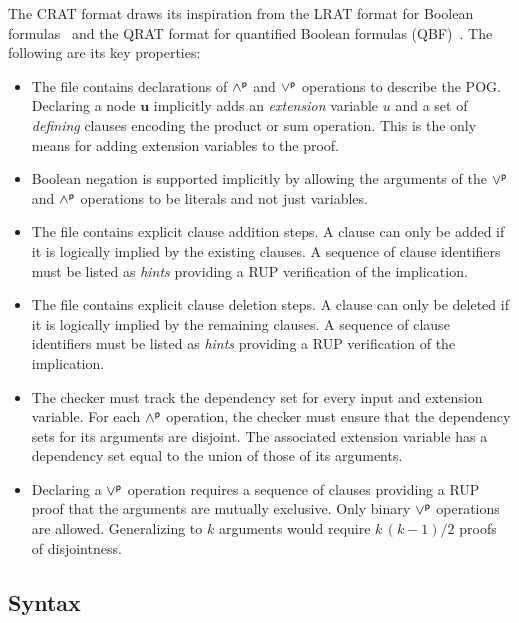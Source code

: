 \documentclass[letterpaper,USenglish,cleveref, autoref, thm-restate]{lipics-v2021}
\newcommand{\pand}{\mathbin{\land^{\sf p}}}
\newcommand{\por}{\mathbin{\lor^{\sf p}}}
\newcommand{\makenode}[1]{\mathbf{#1}}
\newcommand{\nodeu}{\makenode{u}}
\begin{document}
The CRAT format draws its inspiration from the LRAT format for Boolean
formulas~\cite{lrat} and the QRAT format for quantified Boolean
formulas (QBF)~\cite{heule:JAR2014}.  The following are its key properties:
\begin{itemize}
  \item
  The file contains declarations of $\pand$ and $\por$ operations to describe the POG.
  Declaring a node $\nodeu$
implicitly adds an {\em extension} variable $u$ and a set of {\em defining} clauses
  encoding the product or sum operation.
  This is the only means for adding extension variables to the proof.
\item Boolean negation is supported implicitly by allowing the
  arguments of the $\por$ and $\pand$ operations to be literals and not just
  variables.
\item
  The file contains explicit clause addition steps.
  A clause can only be added if it is logically implied by the existing clauses.
  A sequence of clause identifiers must be listed as {\em hints} providing a RUP verification of the implication.
\item
  The file contains explicit clause deletion steps.
  A clause can only be deleted if it is logically implied by the remaining clauses.
  A sequence of clause identifiers must be listed as {\em hints} providing a RUP verification of the implication.
\item The checker must track the dependency set for every input and
  extension variable.  For each $\pand$ operation, the checker must ensure that the dependency sets for its arguments are disjoint.
  The associated extension variable has a dependency set equal to the union of those of its arguments.
\item Declaring a $\por$ operation requires a sequence of clauses
  providing a RUP proof that the arguments are mutually exclusive.
  Only binary $\por$ operations are allowed.  Generalizing to $k$ arguments would require
  $k\,(k-1)/2$ proofs of disjointness.
\end{itemize}

\subsection{Syntax}
\label{subsection:syntax}
\end{document}
